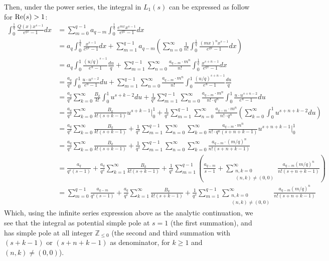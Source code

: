 \documentclass{article}
\newcommand{\ZZ}{\mathbb{Z}}
\newcommand{\Real}{\textmd{Re}}
\begin{document}
Then, under the power series, the integral in $L_1(s)$ can be expressed as follow for $\Real(s)>1$:
\begin{equation}
    \label{eq:9}
    \begin{split}
        \int_{0}^{\frac{1}{q}}\frac{Q(x)x^{s-1}}{e^{qx}-1}dx  &= \sum_{m=0}^{q-1}a_{q-m}\int_{0}^{\frac{1}{q}}\frac{e^{mx}x^{s-1}}{e^{qx}-1}dx\\
        &= a_q\int_{0}^{\frac{1}{q}}\frac{x^{s-1}}{e^{qx}-1}dx + \sum_{m=1}^{q-1}a_{q-m}\left(\sum_{n=0}^{\infty}\frac{1}{n!}\int_{0}^{\frac{1}{q}}\frac{(mx)^nx^{s-1}}{e^{qx}-1}dx\right)\\
        &= a_q\int_{0}^{1}\frac{(u/q)^{s-1}}{e^u-1}\frac{du}{q} + \sum_{m=1}^{q-1}\sum_{n=0}^{\infty}\frac{a_{q-m}\cdot m^n}{n!}\int_{0}^{\frac{1}{q}}\frac{x^{s+n-1}}{e^{qx}-1}dx\\
        &= \frac{a_q}{q^s}\int_{0}^{1}\frac{u\cdot u^{s-2}}{e^u-1}du + \sum_{m=1}^{q-1}\sum_{n=0}^{\infty}\frac{a_{q-m}\cdot m^n}{n!}\int_{0}^{1}\frac{(u/q)^{s+n-1}}{e^u-1}\frac{du}{q}\\
        &=\frac{a_q}{q^s}\sum_{k=0}^{\infty}\frac{B_k}{k!}\int_{0}^{1}u^{s+k-2}du + \frac{1}{q^s}\sum_{m=1}^{q-1}\sum_{n=0}^{\infty}\frac{a_{q-m}\cdot m^n}{n!\cdot q^n}\int_{0}^{1}\frac{u\cdot u^{s+n-2}}{e^u-1}du\\
        &= \frac{a_q}{q^s}\sum_{k=0}^{\infty}\frac{B_k}{k!(s+k-1)}u^{s+k-1}\bigg|_{0}^{1} + \frac{1}{q^s}\sum_{m=1}^{q-1}\sum_{n=0}^{\infty}\frac{a_{q-m}\cdot m^n}{n!\cdot q^n}\left(\sum_{k=0}^{\infty}\int_{0}^{1}u^{s+n+k-2}du\right)\\
        &= \frac{a_q}{q^s}\sum_{k=0}^{\infty}\frac{B_k}{k!(s+k-1)}+\frac{1}{q^s}\sum_{m=1}^{q-1}\sum_{n=0}^{\infty}\sum_{k=0}^{\infty}\frac{a_{q-m}\cdot m^n}{n!\cdot q^n(s+n+k-1)}u^{s+n+k-1}\bigg|_{0}^{1}\\
        &= \frac{a_q}{q^s}\sum_{k=0}^{\infty}\frac{B_k}{k!(s+k-1)}+\frac{1}{q^s}\sum_{m=1}^{q-1}\sum_{n=0}^{\infty}\sum_{k=0}^{\infty}\frac{a_{q-m}\cdot (m/q)^n}{n!(s+n+k-1)}\\
        &= \frac{a_q}{q^s(s-1)} + \frac{a_q}{q^s}\sum_{k=1}^{\infty}\frac{B_k}{k!(s+k-1)} + \frac{1}{q^s}\sum_{m=1}^{q-1}\left(\frac{a_{q-m}}{s-1}+\sum_{\substack{n,k=0\\(n,k)\neq (0,0)}}^{\infty}\frac{a_{q-m}(m/q)^n}{n!(s+n+k-1)}\right)\\
        &= \sum_{m=0}^{q-1}\frac{a_{q-m}}{q^s(s-1)} + \frac{a_q}{q^s}\sum_{k=1}^{\infty}\frac{B_k}{k!(s+k-1)} + \frac{1}{q^s}\sum_{m=1}^{q-1}\sum_{\substack{n,k=0\\(n,k)\neq (0,0)}}^{\infty}\frac{a_{q-m}(m/q)^n}{n!(s+n+k-1)}
    \end{split}
\end{equation}
Which, using the infinite series expression above as the analytic continuation, we see that the integral as potential simple pole at $s=1$ (the first summation), and has simple pole at all integer $\ZZ_{\leq 0}$ (the second and third summation with $(s+k-1)$ or $(s+n+k-1)$ as denominator, for $k\geq 1$ and $(n,k)\neq (0,0)$).
\end{document}
